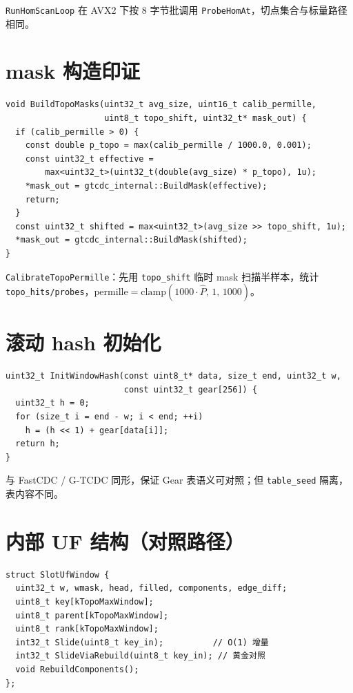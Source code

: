 \texttt{RunHomScanLoop} 在 AVX2 下按 8 字节批调用 \texttt{ProbeHomAt}，切点集合与标量路径相同。

\section{mask 构造印证}

\begin{lstlisting}[caption={BuildTopoMasks（标定优先）},label={lst:build-topo-masks}]
void BuildTopoMasks(uint32_t avg_size, uint16_t calib_permille,
                    uint8_t topo_shift, uint32_t* mask_out) {
  if (calib_permille > 0) {
    const double p_topo = max(calib_permille / 1000.0, 0.001);
    const uint32_t effective =
        max<uint32_t>(uint32_t(double(avg_size) * p_topo), 1u);
    *mask_out = gtcdc_internal::BuildMask(effective);
    return;
  }
  const uint32_t shifted = max<uint32_t>(avg_size >> topo_shift, 1u);
  *mask_out = gtcdc_internal::BuildMask(shifted);
}
\end{lstlisting}

\texttt{CalibrateTopoPermille}：先用 \texttt{topo\_shift} 临时 mask 扫描半样本，统计
\texttt{topo\_hits/probes}，$\mathrm{permille}=\mathrm{clamp}(1000\cdot\hat P,\,1,\,1000)$。

\section{滚动 hash 初始化}

\begin{lstlisting}[caption={InitWindowHash},label={lst:init-window-hash}]
uint32_t InitWindowHash(const uint8_t* data, size_t end, uint32_t w,
                        const uint32_t gear[256]) {
  uint32_t h = 0;
  for (size_t i = end - w; i < end; ++i)
    h = (h << 1) + gear[data[i]];
  return h;
}
\end{lstlisting}

与 FastCDC / G-TCDC 同形，保证 Gear 表语义可对照；但 \texttt{table\_seed} 隔离，表内容不同。

\section{内部 UF 结构（对照路径）}

\begin{lstlisting}[caption={SlotUfWindow（\filepath{topo\_cdc\_internal.h}）},label={lst:slot-uf}]
struct SlotUfWindow {
  uint32_t w, wmask, head, filled, components, edge_diff;
  uint8_t key[kTopoMaxWindow];
  uint8_t parent[kTopoMaxWindow];
  uint8_t rank[kTopoMaxWindow];
  int32_t Slide(uint8_t key_in);          // O(1) 增量
  int32_t SlideViaRebuild(uint8_t key_in); // 黄金对照
  void RebuildComponents();
};
\end{lstlisting}

